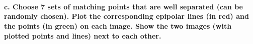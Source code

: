 \documentclass{article}
\begin{document}
    \begin{center}
    \end{center}
    { \hspace*{\fill} \\}
    
    \begin{center}
    \end{center}
    { \hspace*{\fill} \\}
    
    \paragraph{c. Choose 7 sets of matching points that are well separated
(can be randomly chosen). Plot the corresponding epipolar lines (in red)
and the points (in green) on each image. Show the two images (with
plotted points and lines) next to each
other.}\label{c.-choose-7-sets-of-matching-points-that-are-well-separated-can-be-randomly-chosen.-plot-the-corresponding-epipolar-lines-in-red-and-the-points-in-green-on-each-image.-show-the-two-images-with-plotted-points-and-lines-next-to-each-other.}
\end{document}
